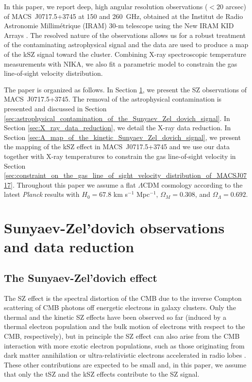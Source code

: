 \documentclass[twocolumn,traditabstract]{aa}
\begin{document}
In this paper, we report deep, high angular resolution observations ($<20$ arcsec) of \mbox{MACS~J0717.5+3745} at 150 and 260~GHz, obtained at the Institut de Radio Astronomie Millim\'etrique (IRAM) 30-m telescope using the New IRAM KID Arrays \citep[NIKA,][]{Monfardini2011,Calvo2013,Adam2014,Catalano2014}. The resolved nature of the observations allows us for a robust treatment of the contaminating astrophysical signal and the data are used to produce a map of the kSZ signal toward the cluster. Combining X-ray spectroscopic temperature measurements with NIKA, we also fit a parametric model to constrain the gas line-of-sight velocity distribution.

The paper is organized as follows. In Section \ref{sec:sunyaev_Zel_dovich_observations_and_data_reduction}, we present the SZ observations of \mbox{MACS~J0717.5+3745}. The removal of the astrophysical contamination is presented and discussed in Section \ref{sec:astrophysical_contamination_of_the_Sunyaev_Zel_dovich_signal}. In Section \ref{sec:X_ray_data_reduction}, we detail the X-ray data reduction. In Section \ref{sec:A_map_of_the_kinetic_Sunyaev_Zel_dovich_signal}, we present the mapping of the kSZ effect in \mbox{MACS~J0717.5+3745} and we use our data together with X-ray temperatures to constrain the gas line-of-sight velocity in Section \ref{sec:constraint_on_the_gas_line_of_sight_velocity_distribution_of_MACSJ0717}. Throughout this paper we assume a flat $\Lambda$CDM cosmology according to the latest {\it Planck} results \citep{Planck2015XIII} with $H_0 = 67.8$ km s$^{-1}$ Mpc$^{-1}$, $\Omega_M = 0.308$, and $\Omega_{\Lambda} = 0.692$.

\section{Sunyaev-Zel'dovich observations and data reduction}\label{sec:sunyaev_Zel_dovich_observations_and_data_reduction}
\subsection{The Sunyaev-Zel'dovich effect}
The SZ effect is the spectral distortion of the CMB due to the inverse Compton scattering of CMB photons off energetic electrons in galaxy clusters. Only the thermal and the kinetic SZ effects have been observed so far (induced by a thermal electron population and the bulk motion of electrons with respect to the CMB, respectively), but in principle the SZ effect can also arise from the CMB interaction with more exotic electron populations, such as those originating from dark matter annihilation \citep{Colafrancesco2004} or ultra-relativistic electrons accelerated in radio lobes \citep{Colafrancesco2008}. These other contributions are expected to be small and, in this paper, we assume that only the tSZ and the kSZ effects contribute to the SZ signal.
\end{document}
